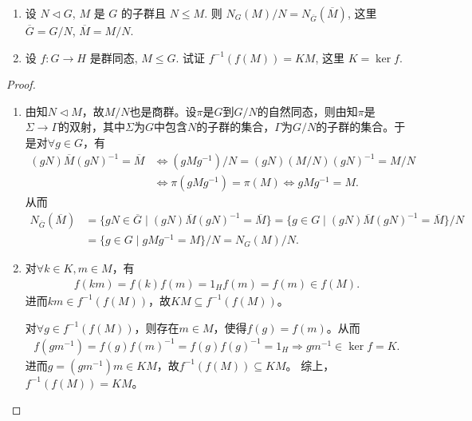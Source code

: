 \documentclass[../../main.tex]{subfiles}%
\begin{document}
\begin{example}
\begin{enumerate}[(1)]
\item 设 $N \lhd G$, $M$ 是 $G$ 的子群且 $N \leqslant M$. 则 $N_G(M)/N = N_{\overline{G}}(\overline{M})$, 这里 $\overline{G}=G/N$, $\overline{M}=M/N$.
\item 设 $f: G \longrightarrow H$ 是群同态, $M \leqslant G$. 试证 $f^{-1}(f(M))=KM$, 这里 $K=\operatorname{ker} f$.
\end{enumerate}
\end{example}
\begin{proof}
\begin{enumerate}[(1)]
\item 由知$N\lhd M$，故$M/N$也是商群。设$\pi$是$G$到$G/N$的自然同态，则由知$\pi$是$\Sigma \rightarrow \Gamma$的双射，其中$\Sigma$为$G$中包含$N$的子群的集合，$\Gamma$为$G/N$的子群的集合。于是对$\forall g\in G$，有\begin{align*}
(gN)\overline{M}(gN)^{-1}=\overline{M}&\Longleftrightarrow (gMg^{-1})/N=(gN)(M/N)(gN)^{-1}=M/N\\
&\Longleftrightarrow \pi(gMg^{-1})=\pi(M)\Longleftrightarrow gMg^{-1}=M.
\end{align*}
从而\begin{align*}
N_{\overline{G}}(\overline{M})&=\{gN\in\overline{G}\mid (gN)\overline{M}(gN)^{-1}=\overline{M}\}=\{g\in G\mid (gN)\overline{M}(gN)^{-1}=\overline{M}\}/N\\
&=\{g\in G\mid gMg^{-1}=M\}/N=N_G(M)/N.
\end{align*}
\item 对$\forall k\in K,m\in M$，有\begin{align*}
f(km)=f(k)f(m)=1_Hf(m)=f(m)\in f(M).
\end{align*}
进而$km\in f^{-1}(f(M))$，故$KM\subseteq f^{-1}(f(M))$。

对$\forall g\in f^{-1}(f(M))$，则存在$m\in M$，使得$f(g)=f(m)$。从而\begin{align*}
f(gm^{-1})=f(g)f(m)^{-1}=f(g)f(g)^{-1}=1_H\Longrightarrow gm^{-1}\in\operatorname{ker}f=K.
\end{align*}
进而$g=(gm^{-1})m\in KM$，故$f^{-1}(f(M))\subseteq KM$。
综上，$f^{-1}(f(M))=KM$。
\end{enumerate}
\end{proof}
\end{document}
